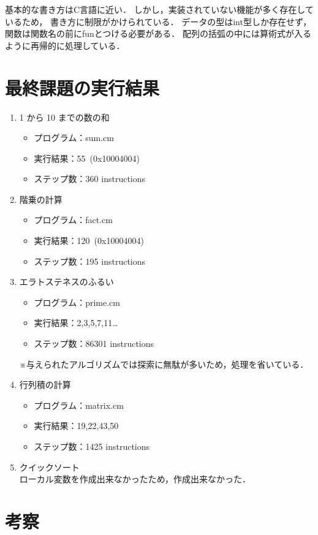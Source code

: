 \documentclass[11pt,a4j]{jarticle}
\begin{document}
基本的な書き方はC言語に近い．
しかし，実装されていない機能が多く存在しているため，
書き方に制限がかけられている．
データの型はint型しか存在せず，関数は関数名の前にfunとつける必要がある．
配列の括弧の中には算術式が入るように再帰的に処理している．



\section{最終課題の実行結果}%

\begin{enumerate}
\item {1 から 10 までの数の和 }
  \begin{itemize}
  \item
    プログラム：sum.cm
  \item
    実行結果：55~(0x10004004)
  \item
    ステップ数：360 instructions
  \end{itemize}
\item {階乗の計算}
  \begin{itemize}
  \item
    プログラム：fact.cm
  \item
    実行結果：120~(0x10004004)
  \item
    ステップ数：195 instructions
  \end{itemize}
\item {エラトステネスのふるい}
  \begin{itemize}
  \item
    プログラム：prime.cm
  \item
    実行結果：2,3,5,7,11\dots
  \item
    ステップ数：86301 instructions
  \end{itemize}
  ※与えられたアルゴリズムでは探索に無駄が多いため，処理を省いている．
\item {行列積の計算}
  \begin{itemize}
  \item
    プログラム：matrix.cm
  \item
    実行結果：19,22,43,50
  \item
    ステップ数：1425 instructions
  \end{itemize}
\item {クイックソート}\\
  ローカル変数を作成出来なかったため，作成出来なかった．
\end{enumerate}



\section{考察}
\end{document}
